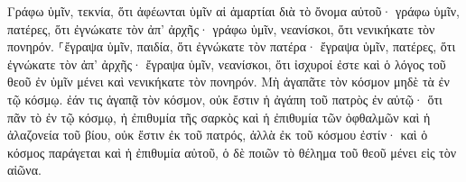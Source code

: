 \documentclass{openreader}
\begin{document}
Γράφω ὑμῖν, τεκνία, ὅτι ἀφέωνται ὑμῖν αἱ ἁμαρτίαι διὰ τὸ ὄνομα αὐτοῦ· γράφω ὑμῖν, πατέρες, ὅτι ἐγνώκατε τὸν ἀπ’ ἀρχῆς· γράφω ὑμῖν, νεανίσκοι, ὅτι νενικήκατε τὸν πονηρόν. ⸀ἔγραψα ὑμῖν, παιδία, ὅτι ἐγνώκατε τὸν πατέρα· ἔγραψα ὑμῖν, πατέρες, ὅτι ἐγνώκατε τὸν ἀπ’ ἀρχῆς· ἔγραψα ὑμῖν, νεανίσκοι, ὅτι ἰσχυροί ἐστε καὶ ὁ λόγος τοῦ θεοῦ ἐν ὑμῖν μένει καὶ νενικήκατε τὸν πονηρόν. Μὴ ἀγαπᾶτε τὸν κόσμον μηδὲ τὰ ἐν τῷ κόσμῳ. ἐάν τις ἀγαπᾷ τὸν κόσμον, οὐκ ἔστιν ἡ ἀγάπη τοῦ πατρὸς ἐν αὐτῷ· ὅτι πᾶν τὸ ἐν τῷ κόσμῳ, ἡ ἐπιθυμία τῆς σαρκὸς καὶ ἡ ἐπιθυμία τῶν ὀφθαλμῶν καὶ ἡ ἀλαζονεία τοῦ βίου, οὐκ ἔστιν ἐκ τοῦ πατρός, ἀλλὰ ἐκ τοῦ κόσμου ἐστίν· καὶ ὁ κόσμος παράγεται καὶ ἡ ἐπιθυμία αὐτοῦ, ὁ δὲ ποιῶν τὸ θέλημα τοῦ θεοῦ μένει εἰς τὸν αἰῶνα. 
\end{document}

